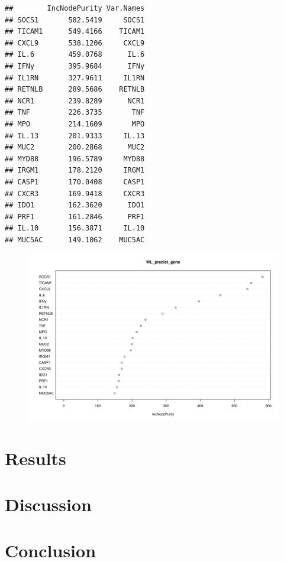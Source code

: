 \documentclass[
]{article}
\begin{document}
\begin{verbatim}
##        IncNodePurity Var.Names
## SOCS1       582.5419     SOCS1
## TICAM1      549.4166    TICAM1
## CXCL9       538.1206     CXCL9
## IL.6        459.0768      IL.6
## IFNy        395.9684      IFNy
## IL1RN       327.9611     IL1RN
## RETNLB      289.5686    RETNLB
## NCR1        239.8289      NCR1
## TNF         226.3735       TNF
## MPO         214.1609       MPO
## IL.13       201.9333     IL.13
## MUC2        200.2868      MUC2
## MYD88       196.5789     MYD88
## IRGM1       178.2120     IRGM1
## CASP1       170.0408     CASP1
## CXCR3       169.9418     CXCR3
## IDO1        162.3620      IDO1
## PRF1        161.2846      PRF1
## IL.10       156.3871     IL.10
## MUC5AC      149.1062    MUC5AC
\end{verbatim}

\begin{figure}[th]
\includegraphics[width=1\linewidth]{TAC_report_2022_files/figure-latex/fig6-1} \end{figure}

\hypertarget{results}{%
\section{Results}\label{results}}

\hypertarget{discussion}{%
\section{Discussion}\label{discussion}}

\hypertarget{conclusion}{%
\section{Conclusion}\label{conclusion}}
\end{document}
